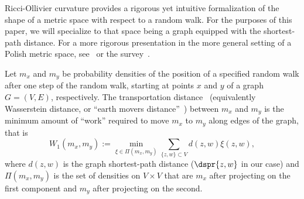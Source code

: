 \documentclass[10pt,twoside,leqno,twocolumn]{article}
\begin{document}
Ricci-Ollivier curvature provides a rigorous yet intuitive formalization of the shape of a metric space with respect to a random walk.
For the purposes of this paper, we will specialize to that space being a graph equipped with the shortest-path distance.
For a more rigorous presentation in the more general setting of a Polish metric space, see~\cite{Ollivier2009-bw} or the survey~\cite{Ollivier2010-ao}.

Let $m_x$ and $m_y$ be probability densities of the position of a specified random walk after one step of the random walk, starting at points $x$ and $y$ of a graph $G = (V,E)$, respectively.
The transportation distance~\cite{Villani2003-wv} (equivalently Wasserstein distance, or ``earth movers distance''~\cite{rubner2000earth}) between $m_x$ and $m_y$ is the minimum amount of ``work'' required to move $m_x$ to $m_y$ along edges of the graph, that is
\vspace{-0.5em}
\begin{equation}
W_1(m_x, m_y) := \min_{\xi \in \Pi(m_x, m_y)} \sum_{\{z,w\} \subset V} d(z,w) \xi(z,w),
\end{equation}
where $d(z,w)$ is the graph shortest-path distance ($\dspr{z,w}$ in our case) and $\Pi(m_x, m_y)$ is the set of densities on $V \times V$ that are $m_x$ after projecting on the first component and $m_y$ after projecting on the second.
\end{document}
